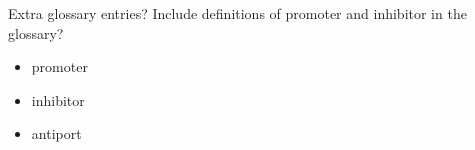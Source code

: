 \documentclass[newzealand,10pt,partial,onehalfspace,examcopy,final]{aucklandthesis}
\theoremstyle{plain}
\begin{document}

\begin{anfxwarning}{Extra glossary entries?}
Include definitions of promoter and inhibitor in the glossary?
\begin{itemize}
    \item promoter
    \item inhibitor
    \item antiport
\end{itemize}
\end{anfxwarning}

\glsresetall

\glsresetall

\glsresetall

\glsresetall

\glsresetall

\glsresetall

\glsresetall

\glsresetall


%
%
%

\backmatter

\cleardoublepage %

% 

\printbibliography[title={Works Cited}, heading=bibintoc]
\end{document}
